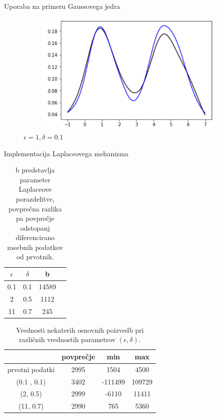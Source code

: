 \documentclass{beamer}
\begin{document}
\begin{frame}{Uporaba na primeru Gaussovega jedra}

\begin{figure}
\centering
\includegraphics[width = 12cm, height = 6cm]{druga}
\caption{$\epsilon = 1, \delta = 0.1$}
\end{figure}
\end{frame}

\begin{frame}{Implementacija Laplaceovega mehanizma}
\begin{table}
\begin{center}
 \begin{tabular}{| c | c | c | c |} 
 \hline
 \textbf{$\epsilon$} & \textbf{$\delta$} & b   \\ [0.5ex] 
 \hline
 0.1 & 0.1 & 14589  \\ 
 \hline
 2 & 0.5 & 1112\\
 \hline
 11 & 0.7 & 245 \\
 \hline
\end{tabular}
\caption{b predstavlja parameter Laplaceove porazdelitve, povprečna razlika pa povprečje odstopanj diferencirano zasebnih podatkov od prvotnih. }
\end{center}
\end{table}
\begin{table}
\begin{center}
 \begin{tabular}{| c | c | c | c |} 
 \hline
 & povprečje & min & max  \\ [0.5ex] 
 \hline
 prvotni podatki & 2995 & 1504 & 4500  \\ 
 \hline
 (0.1 , 0.1) & 3402 & -111499 & 109729\\
 \hline
 (2, 0.5) & 2999 & -6110 & 11411 \\
 \hline
 (11, 0.7) & 2990 & 765 & 5360 \\
 \hline
\end{tabular}
\caption{Vrednosti nekaterih osnovnih poizvedb pri različnih vrednostih parametrov $(\epsilon, \delta)$. }
\end{center}
\end{table}
\end{frame}
\end{document}
